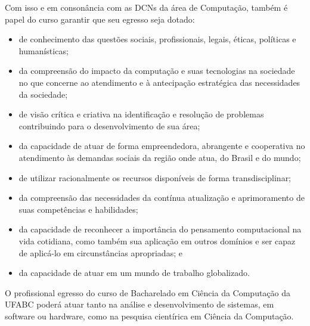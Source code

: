 Com isso e em consonância com as DCNs da área de Computação, também é papel do curso garantir que seu egresso seja dotado:

\begin{itemize}
	\item de conhecimento das questões sociais, profissionais, legais, éticas, políticas e humanísticas;
	\item da compreensão do impacto da computação e suas tecnologias na sociedade no que concerne ao atendimento e à antecipação estratégica das necessidades da sociedade;
	\item de visão crítica e criativa na identificação e resolução de problemas contribuindo para o desenvolvimento de sua área;
	\item da capacidade de atuar de forma empreendedora, abrangente e cooperativa no atendimento às demandas sociais da região onde atua, do Brasil e do mundo;
	\item de utilizar racionalmente os recursos disponíveis de forma transdisciplinar;
	\item da compreensão das necessidades da contínua atualização e aprimoramento de suas competências e habilidades;
	\item da capacidade de reconhecer a importância do pensamento computacional na vida cotidiana, como também sua aplicação em outros domínios e ser capaz de aplicá-lo em circunstâncias apropriadas; e
	\item da capacidade de atuar em um mundo de trabalho globalizado.
\end{itemize}
        
O profissional egresso do curso de Bacharelado em Ciência da Computação da UFABC poderá atuar tanto na análise e desenvolvimento de sistemas, em software ou hardware, como na pesquisa cientírica em Ciência da Computação.

